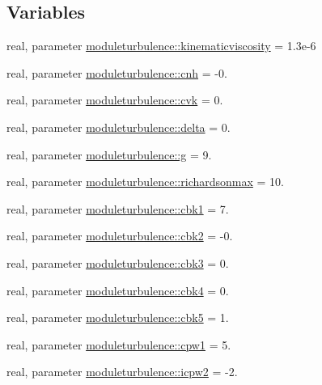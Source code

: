 \subsection*{Variables}
\begin{DoxyCompactItemize}
\item 
real, parameter \mbox{\hyperlink{namespacemoduleturbulence_ad62b0db026f88d0c2b487beade4e08eb}{moduleturbulence\+::kinematicviscosity}} = 1.\+3e-\/6
\item 
real, parameter \mbox{\hyperlink{namespacemoduleturbulence_ac4e0b3b2db8e62f3e9d95ec50f14bdf8}{moduleturbulence\+::cnh}} = -\/0.
\item 
real, parameter \mbox{\hyperlink{namespacemoduleturbulence_adddd5559eb5d60561f50c8458e67485b}{moduleturbulence\+::cvk}} = 0.
\item 
real, parameter \mbox{\hyperlink{namespacemoduleturbulence_ae9d9f2ae68b9865d04266017aa207f35}{moduleturbulence\+::delta}} = 0.
\item 
real, parameter \mbox{\hyperlink{namespacemoduleturbulence_a50b658339ff4d17b0ff8d430db7111dc}{moduleturbulence\+::g}} = 9.
\item 
real, parameter \mbox{\hyperlink{namespacemoduleturbulence_a9ff8d5e43c5a70b1652f6a7a9b1a4167}{moduleturbulence\+::richardsonmax}} = 10.
\item 
real, parameter \mbox{\hyperlink{namespacemoduleturbulence_ada81f70a31cb8c32d07fd796bfe1e5af}{moduleturbulence\+::cbk1}} = 7.
\item 
real, parameter \mbox{\hyperlink{namespacemoduleturbulence_ae6bb5f3b916bb34da86c6520bb9a8911}{moduleturbulence\+::cbk2}} = -\/0.
\item 
real, parameter \mbox{\hyperlink{namespacemoduleturbulence_a0750fdf99ef02d010fc2f831cbf9a47e}{moduleturbulence\+::cbk3}} = 0.
\item 
real, parameter \mbox{\hyperlink{namespacemoduleturbulence_a52421696a2b6905e1b41cb0b06ca3d58}{moduleturbulence\+::cbk4}} = 0.
\item 
real, parameter \mbox{\hyperlink{namespacemoduleturbulence_ac8e07e705f846c0aeb2da32508e51a10}{moduleturbulence\+::cbk5}} = 1.
\item 
real, parameter \mbox{\hyperlink{namespacemoduleturbulence_a50fd1ae32293b82b44a38e05f942167b}{moduleturbulence\+::cpw1}} = 5.
\item 
real, parameter \mbox{\hyperlink{namespacemoduleturbulence_acce43cc93279db98af00c54476c61907}{moduleturbulence\+::icpw2}} = -\/2.
\item 

\end{DoxyCompactItemize}
